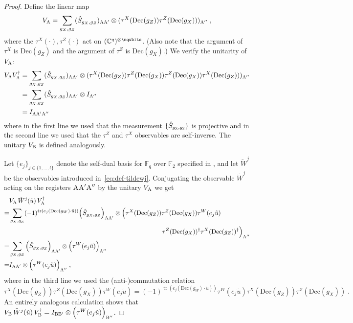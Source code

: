 \documentclass[11pt]{article}
\theoremstyle{definition}
\newcommand{\Id}{\ensuremath{I}}
\newcommand{\C}{\ensuremath{\mathbb{C}}}
\newcommand{\F}{\ensuremath{\mathbb{F}}}
\DeclareMathOperator{\tr}{tr}
\newcommand{\labelstyle}[1]{\ensuremath{\textsc{#1}}\xspace}
\newcommand{\xpt}{\labelstyle{X}}
\newcommand{\zpt}{\labelstyle{Z}}
\newcommand{\alice}{\labelstyle{A}}
\newcommand{\bob}{\labelstyle{B}}
\newcommand{\coded}{\mathrm{Dec}}
\begin{document}
\begin{proof}

Define the linear map
\[
	V_\alice = \sum_{g_X,g_Z} (\hat{S}_{g_X,g_Z})_{\alice \alice'} \otimes (\tau^X(\coded(g_Z)) \tau^Z(\coded(g_X)))_{\alice ''}\;,
\]
where the $\tau^X(\cdot),\tau^Z(\cdot)$ act on $(\C^q)^{\otimes \nqubits}$. (Also note that the argument of $\tau^X$ is $\coded(g_Z)$ and the argument of $\tau^Z$ is $\coded(g_X)$.) We verify the unitarity of $V_\alice$:
\begin{align*}
	V_\alice V_\alice^\dagger &= \sum_{g_X,g_Z} (\hat{S}_{g_X,g_Z})_{\alice \alice'} \otimes (\tau^X(\coded(g_Z)) \tau^Z(\coded(g_X)) \tau^Z(\coded(g_X)) \tau^X(\coded(g_Z)) )_{\alice ''} \\
	&= \sum_{g_X,g_Z} (\hat{S}_{g_X,g_Z})_{\alice \alice'} \otimes \Id_{\alice ''} \\
	&= \Id_{\alice \alice' \alice''}
\end{align*}
where in the first line we used that the measurement $\{ \hat{S}_{g_\xpt,g_\zpt} \}$  is projective and in the second line we used that the $\tau^Z$ and $\tau^X$ observables are self-inverse. The unitary $V_\bob$ is defined analogously.

Let $\{e_j\}_{j \in \{1,\ldots,t\}}$ denote the self-dual basis for $\F_q$ over $\F_2$ specified in , and let $\tilde{W}^j$ be the observables introduced in~\eqref{eq:def-tildewj}. Conjugating the observable $\tilde{W}^j$ acting on the registers $\alice \alice' \alice''$ by the unitary $V_\alice$ we get
\begin{align*}
	&V_\alice \, \tilde{W}^j(\tilde{u}) \, V_\alice^\dagger \\
  =& \sum_{g_X, g_Z} (-1)^{\tr( e_j(\coded(g_W) \cdot \tilde{u}))} \Big( \hat{S}_{g_X,g_Z}  \Big)_{\alice \alice'} \otimes \Big ( \tau^X(\coded(g_Z)) \tau^Z(\coded(g_X)) \tau^W(e_j \tilde{u}) \\
  &\hspace{24em}\tau^Z(\coded(g_X))^\dagger \tau^X(\coded(g_Z))^\dagger \Big)_{\alice ''} \\
	 =& \sum_{g_X, g_Z} \Big( \hat{S}_{g_X,g_Z}  \Big)_{\alice \alice'} \otimes \Big ( \tau^W(e_j \tilde{u}) \Big)_{\alice ''} \\
	 =& \Id_{\alice \alice'} \otimes \Big( \tau^W(e_j \tilde{u}) \Big)_{\alice ''}\;,
\end{align*}
where in the third line we used the (anti-)commutation relation
\[
	\tau^X(\coded(g_Z)) \tau^Z(\coded(g_X)) \tau^W(e_j \tilde{u}) = (-1)^{\tr( e_j(\coded(g_W) \cdot \tilde{u}))} \tau^W(e_j \tilde{u}) \tau^X(\coded(g_Z)) \tau^Z(\coded(g_X)) \;.
\]
An entirely analogous calculation shows that $V_\bob \, \tilde{W}^j(\tilde{u}) \, V_\bob^\dagger = \Id_{\bob \bob'} \otimes \Big( \tau^W(e_j \tilde{u}) \Big)_{\bob ''}$.


\end{proof}
\end{document}
